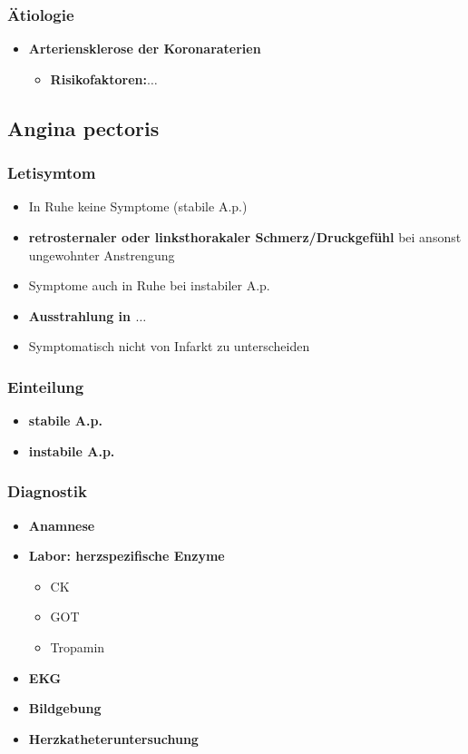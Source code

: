 		\subsubsection{Ätiologie}
			\begin{itemize}
				\item \textbf{Arteriensklerose der Koronaraterien}
					\begin{itemize}
						\item \textbf{Risikofaktoren:$\dots$}
					\end{itemize}
			\end{itemize}
	\subsection{Angina pectoris}
		\subsubsection{Letisymtom}
			\begin{itemize}
				\item In Ruhe keine Symptome (stabile A.p.)
				\item \textbf{retrosternaler oder linksthorakaler Schmerz/Druckgefühl} bei ansonst ungewohnter Anstrengung
				\item Symptome auch in Ruhe bei instabiler A.p.
				\item \textbf{Ausstrahlung in $\dots$}
				\item Symptomatisch nicht von Infarkt zu unterscheiden
			\end{itemize}
		\subsubsection{Einteilung}
			\begin{itemize}
				\item \textbf{stabile A.p.}
				\item \textbf{instabile A.p.}
			\end{itemize}
		\subsubsection{Diagnostik}
			\begin{itemize}
				\item \textbf{Anamnese}
				\item \textbf{Labor: herzspezifische Enzyme}
					\begin{itemize}
						\item CK
						\item GOT
						\item Tropamin
					\end{itemize}
				\item \textbf{EKG}
				\item \textbf{Bildgebung}
				\item \textbf{Herzkatheteruntersuchung}
			\end{itemize}

